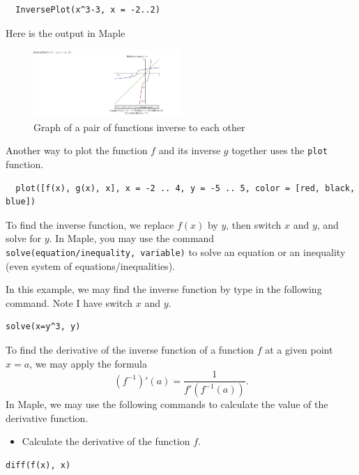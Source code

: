 \documentclass[en,11pt,simple]{elegantbook}
\begin{document}
\begin{verbatim}
  InversePlot(x^3-3, x = -2..2)
\end{verbatim}

Here is the output in Maple

\begin{figure}
\centering
\includegraphics[width=0.5\textwidth,height=\textheight]{figs/InversePlot1.png}
\caption{Graph of a pair of functions inverse to each other}
\end{figure}

Another way to plot the function \(f\) and its inverse \(g\) together uses the \texttt{plot} function.

\begin{verbatim}
  plot([f(x), g(x), x], x = -2 .. 4, y = -5 .. 5, color = [red, black, blue])
\end{verbatim}

To find the inverse function, we replace \(f(x)\) by \(y\), then switch \(x\) and \(y\), and solve for \(y\). In Maple, you may use the command \texttt{solve(equation/inequality,\ variable)} to solve an equation or an inequality (even system of equations/inequalities).

In this example, we may find the inverse function by type in the following command. Note I have switch \(x\) and \(y\).

\begin{verbatim}
solve(x=y^3, y)
\end{verbatim}

To find the derivative of the inverse function of a function \(f\) at a given point \(x=a\), we may apply the formula
\[(f^{-1})'(a)=\dfrac{1}{f'(f^{-1}(a))}.\]
In Maple, we may use the following commands to calculate the value of the derivative function.

\begin{itemize}

\item
  Calculate the derivative of the function \(f\).
\end{itemize}

\begin{verbatim}
diff(f(x), x)
\end{verbatim}
\end{document}
